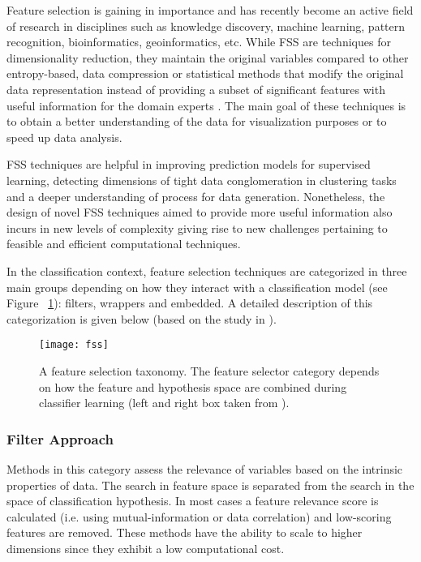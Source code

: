 Feature selection is gaining in importance and has recently become an active field of research in disciplines such as knowledge discovery, machine learning, pattern recognition, bioinformatics, geoinformatics, etc.  While FSS are techniques for dimensionality reduction, they maintain the original variables compared to other entropy-based, data compression or statistical methods that modify the original data representation instead of providing a subset of significant features with useful information for the domain experts \cite{larranaga07}. The main goal of these techniques is to obtain a better understanding of the data for visualization purposes or to speed up data analysis.

FSS techniques are helpful in improving prediction models for supervised learning, detecting dimensions of tight data conglomeration in clustering tasks and a deeper understanding of process for data generation. Nonetheless, the design of novel FSS techniques aimed to provide more useful information also incurs in new levels of complexity giving rise to new challenges pertaining to feasible and efficient computational techniques.  

In the classification context, feature selection techniques are categorized in three main groups depending on how they interact with a classification model (see Figure ~\ref{fig:im09}):  filters, wrappers and embedded. A detailed description of this categorization is given below (based on the study in \cite{larranaga08}).

\begin{figure}[ht]
	\centering
		\texttt{[image: fss]}
	\caption[A feature selection taxonomy.]%
	{A feature selection taxonomy.  The feature selector category depends on how the feature and hypothesis space are combined during classifier learning (left and right box taken from \cite{larranaga07}).}
	\label{fig:im09}
\end{figure}

\subsubsection{Filter Approach}
Methods in this category assess the relevance of variables based on the intrinsic properties of data.  The search in feature space is separated from the search in the space of classification hypothesis.  In most cases a feature relevance score is calculated (i.e. using mutual-information or data correlation) and low-scoring features are removed.  These methods have the ability to scale to higher dimensions since they exhibit a low computational cost.
